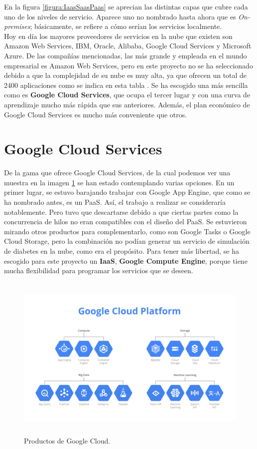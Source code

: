\documentclass[12pt,spanish,listoffigures,listoftables]{tfgetsinf}
\begin{document}
En la figura \ref{figura:IaasSaasPaas} se aprecian las distintas capas que cubre cada uno de los niveles de servicio. Aparece uno no nombrado hasta ahora que es \textit{On-premises}; básicamente, se refiere a cómo serían los servicios localmente. \\

Hoy en día los mayores proveedores de servicios en la nube que existen son Amazon Web Services, IBM, Oracle, Alibaba, Google Cloud Services y Microsoft Azure. De las compañías mencionadas, las más grande y empleada en el mundo empresarial es Amazon Web Services, pero en este proyecto no se ha seleccionado debido a que la complejidad de su nube es muy alta, ya que ofrecen un total de 2400 aplicaciones como se indica en esta tabla \cite{ComparativaCloud}. Se ha escogido una más sencilla como es \textbf{Google Cloud Services}, que ocupa el tercer lugar y con una curva de aprendizaje mucho más rápida que sus anteriores. Además, el plan económico de Google Cloud Services es mucho más conveniente que otros. \\

\section{Google Cloud Services}

De la gama que ofrece Google Cloud Services, de la cual podemos ver una muestra en la imagen \ref{figura:googlecloudproducts} se han estado contemplando varias opciones. En un primer lugar, se estuvo barajando trabajar con Google App Engine, que como se ha nombrado antes, es un PaaS. Así, el trabajo a realizar se consideraría notablemente. Pero tuvo que descartarse debido a que ciertas partes como la concurrencia de hilos no eran compatibles con el diseño del PaaS. Se estuvieron mirando otros productos para complementarlo, como son Google Tasks o Google Cloud Storage, pero la combinación no podían generar un servicio de simulación de diabetes en la nube, como era el propósito. Para tener más libertad, se ha escogido para este proyecto un \textbf{IaaS}, \textbf{Google Compute Engine}, porque tiene mucha flexibilidad para programar los servicios que se deseen. \\

\begin{figure}[!h]
	\centering
	\includegraphics[height=8cm]{img/googlecloudproducts}
	\caption{Productos de Google Cloud.}
	\label{figura:googlecloudproducts}
\end{figure}
\end{document}

